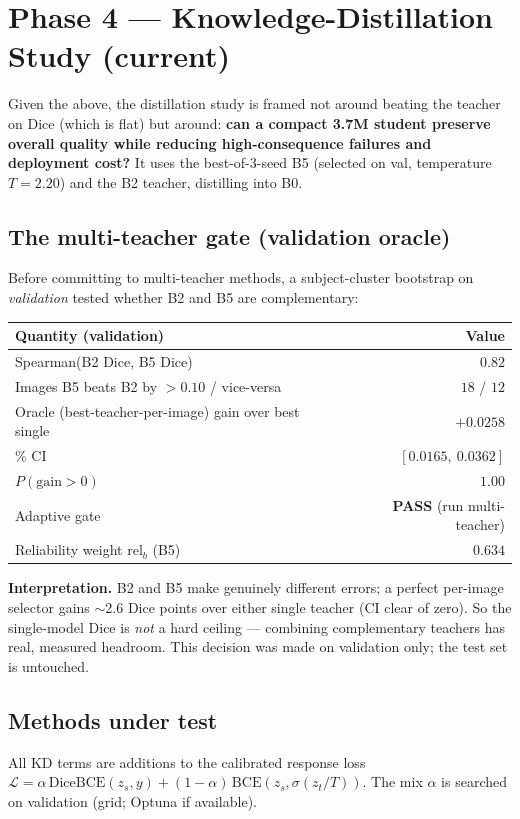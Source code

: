 \documentclass[11pt]{article}
\begin{document}
\section{Phase 4 --- Knowledge-Distillation Study (current)}

Given the above, the distillation study is framed not around beating the teacher on Dice (which is
flat) but around: \textbf{can a compact 3.7M student preserve overall quality while reducing
high-consequence failures and deployment cost?} It uses the best-of-3-seed B5 (selected on val,
temperature $T{=}2.20$) and the B2 teacher, distilling into B0.

\subsection{The multi-teacher gate (validation oracle)}
Before committing to multi-teacher methods, a subject-cluster bootstrap on \emph{validation} tested
whether B2 and B5 are complementary:

\begin{center}\small
\begin{tabular}{l R}
\toprule
Quantity (validation) & Value \\
\midrule
Spearman(B2 Dice, B5 Dice) & $0.82$ \\
Images B5 beats B2 by $>0.10$ / vice-versa & $18$ / $12$ \\
Oracle (best-teacher-per-image) gain over best single & $+0.0258$ \\
\% CI & $[0.0165,\ 0.0362]$ \\
\quad $P(\text{gain}>0)$ & $1.00$ \\
Adaptive gate & \textbf{PASS} (run multi-teacher) \\
Reliability weight $\mathrm{rel}_b$ (B5) & $0.634$ \\
\bottomrule
\end{tabular}
\end{center}

\textbf{Interpretation.} B2 and B5 make genuinely different errors; a perfect per-image selector
gains $\sim$2.6 Dice points over either single teacher (CI clear of zero). So the single-model
Dice is \emph{not} a hard ceiling --- combining complementary teachers has real, measured headroom.
This decision was made on validation only; the test set is untouched.

\subsection{Methods under test}
All KD terms are additions to the calibrated response loss
$\mathcal{L}=\alpha\,\mathrm{DiceBCE}(z_s,y)+(1-\alpha)\,\mathrm{BCE}(z_s,\sigma(z_t/T))$.
The mix $\alpha$ is searched on validation (grid; Optuna if available).
\end{document}
